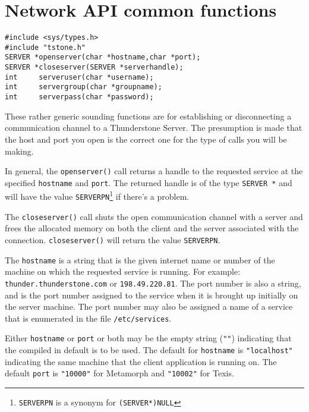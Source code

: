 
\newpage\section{Network API common functions}


\SYNOPSIS
\begin{verbatim}
#include <sys/types.h>
#include "tstone.h"
SERVER *openserver(char *hostname,char *port);
SERVER *closeserver(SERVER *serverhandle);
int     serveruser(char *username);
int     servergroup(char *groupname);
int     serverpass(char *password);
\end{verbatim}

\DESCRIPTION

These rather generic sounding functions are for establishing or
disconnecting a communication channel to a Thunderstone Server.  The
presumption is made that the host and port you open is the correct one for
the type of calls you will be making.

In general, the \verb`openserver()` call returns a handle to the requested
service at the specified \verb`hostname` and \verb`port`.  The returned
handle is of the type \verb`SERVER *` and will have the value
\verb`SERVERPN`\footnote{\verb`SERVERPN` is a synonym for \verb`(SERVER*)NULL`} if there's a problem.

The \verb`closeserver()` call shuts the open communication channel with
a server and frees the allocated memory on both the client and the
server associated with the connection. \verb`closeserver()` will
return the value \verb`SERVERPN`.

The \verb`hostname` is a string that is the given internet name
or number of the machine on which the requested service is running.
For example: \verb`thunder.thunderstone.com` or \verb`198.49.220.81`.
The port number is also a string, and is the port number assigned to
the service when it is brought up initially on the server machine. The
port number may also be assigned a name of a service that is enumerated
in the file \verb`/etc/services`.

Either \verb`hostname` or \verb`port` or both may be the empty string
(\verb`""`) indicating that the compiled in default is to be used.  The
default for \verb`hostname` is \verb`"localhost"` indicating the same
machine that the client application is running on.  The default
\verb`port` is \verb`"10000"` for Metamorph and \verb`"10002"` for Texis.


